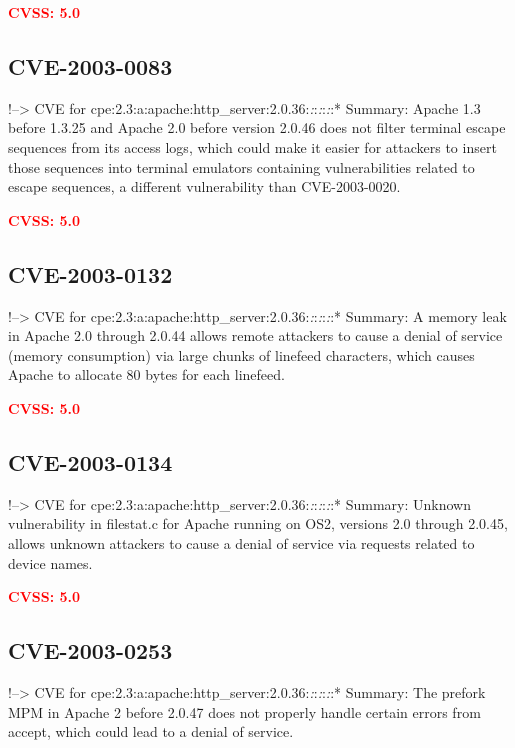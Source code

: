 \documentclass[a4paper, 12pt]{article}
\begin{document}
\textbf{\textcolor{red}{CVSS: 5.0}}

\hypertarget{cve-2003-0083}{%
\subsection{CVE-2003-0083}\label{cve-2003-0083}}

!--\textgreater{} CVE for
cpe:2.3:a:apache:http\_server:2.0.36:\emph{:}:\emph{:}:\emph{:}:*
Summary: Apache 1.3 before 1.3.25 and Apache 2.0 before version 2.0.46
does not filter terminal escape sequences from its access logs, which
could make it easier for attackers to insert those sequences into
terminal emulators containing vulnerabilities related to escape
sequences, a different vulnerability than CVE-2003-0020.

\textbf{\textcolor{red}{CVSS: 5.0}}

\hypertarget{cve-2003-0132}{%
\subsection{CVE-2003-0132}\label{cve-2003-0132}}

!--\textgreater{} CVE for
cpe:2.3:a:apache:http\_server:2.0.36:\emph{:}:\emph{:}:\emph{:}:*
Summary: A memory leak in Apache 2.0 through 2.0.44 allows remote
attackers to cause a denial of service (memory consumption) via large
chunks of linefeed characters, which causes Apache to allocate 80 bytes
for each linefeed.

\textbf{\textcolor{red}{CVSS: 5.0}}

\hypertarget{cve-2003-0134}{%
\subsection{CVE-2003-0134}\label{cve-2003-0134}}

!--\textgreater{} CVE for
cpe:2.3:a:apache:http\_server:2.0.36:\emph{:}:\emph{:}:\emph{:}:*
Summary: Unknown vulnerability in filestat.c for Apache running on OS2,
versions 2.0 through 2.0.45, allows unknown attackers to cause a denial
of service via requests related to device names.

\textbf{\textcolor{red}{CVSS: 5.0}}

\hypertarget{cve-2003-0253}{%
\subsection{CVE-2003-0253}\label{cve-2003-0253}}

!--\textgreater{} CVE for
cpe:2.3:a:apache:http\_server:2.0.36:\emph{:}:\emph{:}:\emph{:}:*
Summary: The prefork MPM in Apache 2 before 2.0.47 does not properly
handle certain errors from accept, which could lead to a denial of
service.
\end{document}
